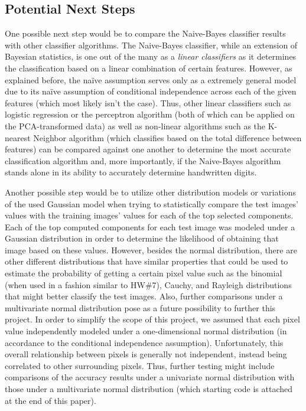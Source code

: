 \documentclass[twocolumn]{article}
\begin{document}
\subsection{Potential Next Steps}
\label{subsec:next steps}

One possible next step would be to compare the Naive-Bayes classifier results with other classifier algorithms. The Naive-Bayes classifier, while an extension of Bayesian statistics, is one out of the many as a \emph{linear classifiers} as it determines the classification based on a linear combination of certain features. However, as explained before, the naïve assumption serves only as a extremely general model due to its naïve assumption of conditional independence across each of the given features (which most likely isn't the case). Thus, other linear classifiers such as logistic regression or the perceptron algorithm (both of which can be applied on the PCA-transformed data) as well as non-linear algorithms such as the K-nearest Neighbor algorithm (which classifies based on the total difference between features) can be compared against one another to determine the most accurate classification algorithm and, more importantly, if the Naive-Bayes algorithm stands alone in its ability to accurately determine handwritten digits.

Another possible step would be to utilize other distribution models or variations of the used Gaussian model when trying to statistically compare the test images' values with the training images' values for each of the top selected components. Each of the top computed components for each test image was modeled under a Gaussian distribution in order to determine the likelihood of obtaining that image based on these values. However, besides the normal distribution, there are other different distributions that have similar properties that could be used to estimate the probability of getting a certain pixel value such as the binomial (when used in a fashion similar to HW\#7), Cauchy, and Rayleigh distributions that might better classify the test images. Also, further comparisons under a multivariate normal distribution pose as a future possibility to further this project. In order to simplify the scope of this project, we assumed that each pixel value independently modeled under a one-dimensional normal distribution (in accordance to the conditional independence assumption). Unfortunately, this overall relationship between pixels is generally not independent, instead being correlated to other surrounding pixels. Thus, further testing might include comparisons of the accuracy results under a univariate normal distribution with those under a multivariate normal distribution (which starting code is attached at the end of this paper). 
\end{document}
